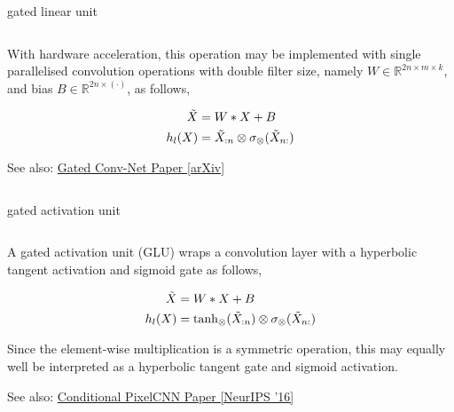 \documentclass[aspectratio=169,xcolor={dvipsnames,svgnames}]{beamer}
\begin{document}
\begin{frame}[label={sec:org0d44782}]{gated linear unit}
\begin{columns}
\begin{column}{0.45\columnwidth}
With hardware acceleration, this operation may be
implemented with single parallelised convolution
operations with double filter size, namely
\(W\in\mathbb{R}^{2n\times m\times k}\), and bias
\(B\in\mathbb{R}^{2n\times(\cdot)}\), as follows,

\begin{align}
  \notag
  \tilde{X} &= W*X+B \\
  \notag
  h_l(X) &= \tilde{X}_{:n} \otimes \sigma_{\otimes}
           (\tilde{X}_{n:})
\end{align}

\alert{See also:} \href{https://arxiv.org/abs/1612.08083}{Gated Conv-Net Paper [arXiv]​}
\end{column}
\end{columns}
\end{frame}

\begin{frame}[label={sec:gated-activation-unit}]{gated activation unit}
\begin{columns}
\begin{column}{0.7\columnwidth}
A gated activation unit (GLU) wraps a convolution layer
with a hyperbolic tangent activation and sigmoid gate
as follows,

\begin{align}
  \notag
  \tilde{X} &= W*X+B \\
  \notag
  h_l(X) &= \tanh_{\otimes} (\tilde{X}_{:n}) \otimes
           \sigma_{\otimes} (\tilde{X}_{n:}) 
\end{align}

Since the element-wise multiplication is a symmetric
operation, this may equally well be interpreted as a
hyperbolic tangent gate and sigmoid activation.

\alert{See also:} \href{https://proceedings.neurips.cc/paper\_files/paper/2016/hash/b1301141feffabac455e1f90a7de2054-Abstract.html}{Conditional PixelCNN Paper [NeurIPS '16]​}
\end{column}
\end{columns}
\end{frame}
\end{document}
